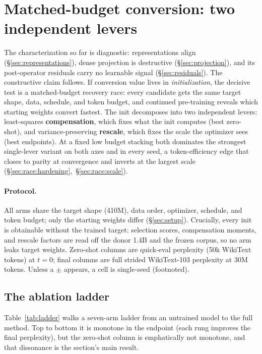 \section{Matched-budget conversion: two independent levers}
\label{sec:race}

The characterization so far is diagnostic: representations align
(\S\ref{sec:representations}), dense projection is destructive
(\S\ref{sec:projection}), and its post-operator residuals carry no learnable
signal (\S\ref{sec:residuals}). The constructive claim follows. If conversion value
lives in \emph{initialization}, the decisive test is a matched-budget recovery
race: every candidate gets the same target shape, data, schedule, and token
budget, and continued pre-training reveals which starting weights convert
fastest. The init decomposes into two independent levers:
least-squares \textbf{compensation}, which fixes what the init computes
(best zero-shot), and variance-preserving \textbf{rescale}, which fixes the
scale the optimizer sees (best endpoints). At a fixed low budget stacking
both dominates the strongest single-lever variant on both axes and in every seed,
a token-efficiency edge that closes to parity at convergence and inverts at
the largest scale (\S\ref{sec:race:hardening},~\S\ref{sec:race:scale}).

\paragraph{Protocol.}
All arms share the target shape (410M), data order, optimizer, schedule, and
token budget; only the starting weights differ (\S\ref{sec:setup}). Crucially,
every init is obtainable without the trained target: selection scores,
compensation moments, and rescale factors are read off the donor 1.4B and the
frozen corpus, so no arm leaks target weights. Zero-shot columns are quick-eval
perplexity (50k WikiText tokens) at $t{=}0$; final columns are full strided
WikiText-103 perplexity at 30M tokens. Unless a $\pm$ appears, a cell is
single-seed (footnoted).

\subsection{The ablation ladder}
\label{sec:race:ladder}

Table~\ref{tab:ladder} walks a seven-arm ladder from an untrained model to the
full method. Top to bottom it is monotone in the endpoint (each rung improves
the final perplexity), but the zero-shot column is emphatically not
monotone, and that dissonance is the section's main result.

